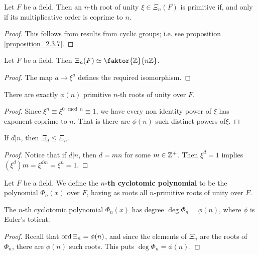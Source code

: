 \begin{proposition}\label{proposition_8.7.3}
  Let $F$ be a field. Then an $n$-th root of unity $\xi \in \Xi_n(F)$
  is primitive if, and only if its multiplicative order is coprime to
  $n$.
\end{proposition}
\begin{proof}
  This follows from results from cyclic groups; i.e. see proposition
  \ref{proposition_2.3.7}.
\end{proof}

\begin{proposition}\label{proposition_8.7.4}
  Let $F$ be a field. Then $\Xi_n(F) \simeq \faktor{\Z}{n\Z}$.
\end{proposition}
\begin{proof}
  The map $a \xrightarrow{} \xi^a$ defines the required isomorphism.
\end{proof}
\begin{corollary}
  There are exactly $\phi(n)$ primitive $n$-th roots of unity over
  $F$.
\end{corollary}
\begin{proof}
  Since $\xi^n \equiv \xi^{0 \mod{n}} \equiv 1$, we have every non identity
  power of $\xi$ has exponent coprime to  $n$. That is there are $\phi(n)$
  such distinct powers of$\xi$.
\end{proof}
\begin{corollary}
  If $d|n$, then  $\Xi_d \leq \Xi_n$.
\end{corollary}
\begin{proof}
  Notice that if $d|n$, then $d=mn$ for some  $m \in \mathbb{Z}^+$. Then $\xi^d=1$
  implies  $(\xi^d)m=\xi^{dm}=\xi^n=1$.
\end{proof}

\begin{definition}
  Let $F$ be a field. We define the \textbf{$n$-th cyclotomic
  polynomial} to be the polynomial $\Phi_n(x)$ over $F$,
  having as roots all $n$-primitive roots of unity over $F$.
\end{definition}

\begin{proposition}\label{proposition_8.7.5}
  The $n$-th cyclotomic polynomial  $\Phi_n(x)$ has degree
  $\deg{\Phi_n}=\phi(n)$, where $\phi$ is Euler's totient.
\end{proposition}
\begin{proof}
  Recall that $\operatorname{ord}{\Xi_n}=\phi(n)$, and since the elements of $\Xi_n$ are the
  roots of  $\Phi_n$, there are  $\phi(n)$ such roots. This puts
  $\deg{\Phi_n}=\phi(n)$.
\end{proof}

